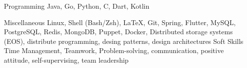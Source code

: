 

\begin{cvskills}

  \cvskill
    {Programming} %
    {Java, Go, Python, C, Dart, Kotlin} %

  \cvskill
    {Miscellaneous} %
    {Linux, Shell (Bash/Zsh), \LaTeX, Git, Spring, Flutter, MySQL, PostgreSQL, Redis, MongoDB, Puppet, Docker, Distributed storage systems (EOS), distribute programming, desing patterns, design architectures} %
  \cvskill
    {Soft Skills} %
    {Time Management, Teamwork, Problem-solving, communication, positive attitude, self-supervising, team leadership} %

\end{cvskills}
